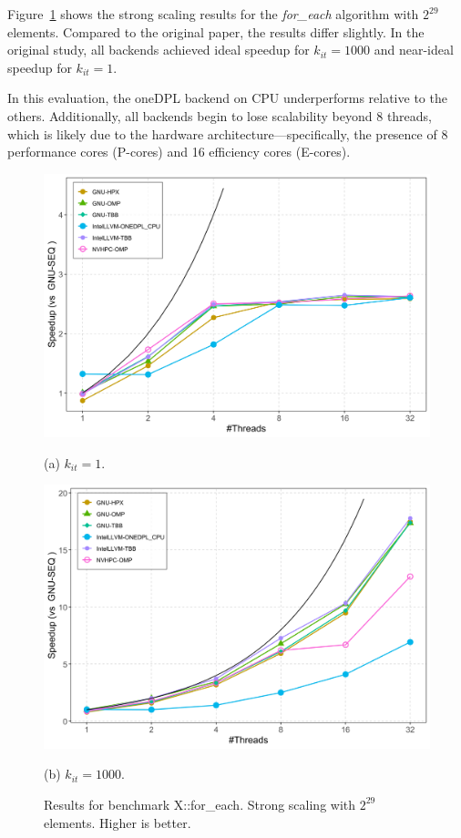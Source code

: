 \documentclass[sigconf]{acmart}
\begin{document}
Figure~\ref{fig:speedup_threads-for_each} shows the strong scaling results for
the \textit{for\_each} algorithm with $2^{29}$ elements. Compared to the
original paper, the results differ slightly. In the original study, all
backends achieved ideal speedup for $k_{it} = 1000$ and near-ideal speedup for
$k_{it} = 1$.

In this evaluation, the oneDPL backend on CPU underperforms relative to the
others. Additionally, all backends begin to lose scalability beyond 8 threads,
which is likely due to the hardware architecture—specifically, the presence of
8 performance cores (P-cores) and 16 efficiency cores (E-cores).

\begin{figure}[H]
      \centering
      \begin{minipage}[t]{0.48\linewidth}
            \centering
            \includegraphics[width=\linewidth]{figures/speedup_threads-for_each-k1.png}
            \caption*{(a) $k_{it} = 1$.}
      \end{minipage}
      \hfill
      \begin{minipage}[t]{0.48\linewidth}
            \centering
            \includegraphics[width=\linewidth]{figures/speedup_threads-for_each-k1000.png}
            \caption*{(b) $k_{it} = 1000$.}
      \end{minipage}
      \caption{Results for benchmark X::for\_each. Strong scaling with $2^{29}$
            elements. Higher is better.}\label{fig:speedup_threads-for_each}
\end{figure}
\end{document}
